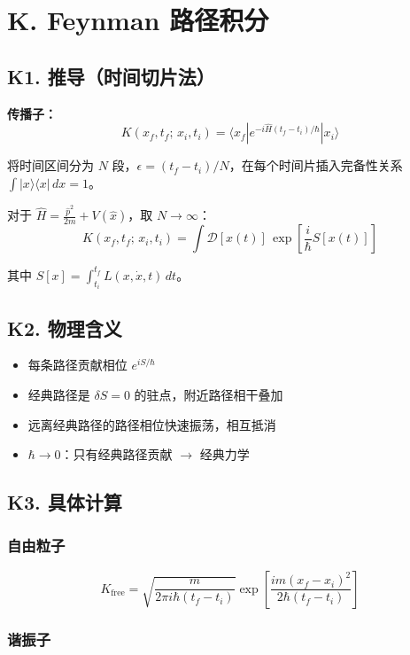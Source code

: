 \section{K. Feynman 路径积分}

\subsection{K1. 推导（时间切片法）}

\textbf{传播子：}
\[
K(x_f, t_f;\, x_i, t_i) = \langle x_f | e^{-i\hat{H}(t_f-t_i)/\hbar} | x_i \rangle
\]

将时间区间分为 $N$ 段，$\epsilon = (t_f - t_i)/N$，在每个时间片插入完备性关系 $\int |x\rangle\langle x|\,dx = 1$。

对于 $\hat{H} = \frac{\hat{p}^2}{2m} + V(\hat{x})$，取 $N \to \infty$：
\[
\boxed{K(x_f, t_f;\, x_i, t_i) = \int \mathcal{D}[x(t)]\, \exp\left[\frac{i}{\hbar}S[x(t)]\right]}
\]

其中 $S[x] = \displaystyle\int_{t_i}^{t_f} L(x, \dot{x}, t)\,dt$。

\subsection{K2. 物理含义}

\begin{itemize}
  \item 每条路径贡献相位 $e^{iS/\hbar}$
  \item 经典路径是 $\delta S = 0$ 的驻点，附近路径相干叠加
  \item 远离经典路径的路径相位快速振荡，相互抵消
  \item $\hbar \to 0$：只有经典路径贡献 $\to$ 经典力学
\end{itemize}

\subsection{K3. 具体计算}

\subsubsection{自由粒子}

\[
K_{\text{free}} = \sqrt{\frac{m}{2\pi i\hbar(t_f-t_i)}} \exp\left[\frac{im(x_f-x_i)^2}{2\hbar(t_f-t_i)}\right]
\]

\subsubsection{谐振子}

